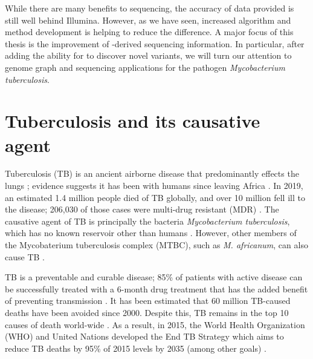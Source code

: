 \hspace{0.75cm}

\noindent
While there are many benefits to \ont{} sequencing, the accuracy of data provided is still well behind Illumina. However, as we have seen, increased algorithm and method development is helping to reduce the difference. A major focus of this thesis is the improvement of \ont{}-derived sequencing information. In particular, after adding the ability for \pandora{} to discover novel variants, we will turn our attention to genome graph and \ont{} sequencing applications for the pathogen \textit{Mycobacterium tuberculosis}.

\section{Tuberculosis and its causative agent}

Tuberculosis (TB) is an ancient airborne disease that predominantly effects the lungs \cite{Pai2016}; evidence suggests it has been with humans since leaving Africa \cite{Wirth2008,Comas2013}. In 2019, an estimated 1.4 million people died of TB globally, and over 10 million fell ill to the disease; 206,030 of those cases were multi-drug resistant (MDR) \cite{who2020}. The causative agent of TB is principally the bacteria \textit{Mycobacterium tuberculosis}, which has no known reservoir other than humans \cite{Comas2013}. However, other members of the Mycobaterium tuberculosis complex (MTBC), such as \textit{M. africanum}, can also cause TB \cite{Pai2016}. 

TB is a preventable and curable disease; 85\% of patients with active disease can be successfully treated with a 6-month drug treatment that has the added benefit of preventing transmission \cite{who2020}. It has been estimated that 60 million TB-caused deaths have been avoided since 2000. Despite this, TB remains in the top 10 causes of death world-wide \cite{who2020}. As a result, in 2015, the World Health Organization (WHO) and United Nations developed the End TB Strategy which aims to reduce TB deaths by 95\% of 2015 levels by 2035 (among other goals) \cite{endtb2020}. 

